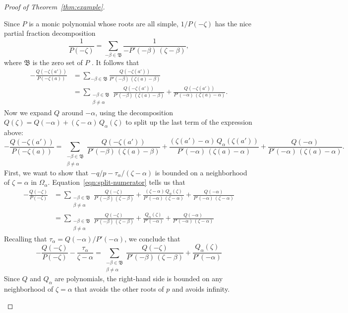 \documentclass{article}
\theoremstyle{plain}
\newcommand{\roots}{\mathfrak{B}}
\newcommand{\domain}{\Omega}
\begin{document}
\begin{proof}[Proof of Theorem~\ref{thm:example}]
\begin{itemize}
Since $P$ is a monic polynomial whose roots are all simple, $1/P(-\zeta)$ has the nice partial fraction decomposition
\[ \frac{1}{P(-\zeta)} = \sum_{-\beta \in \roots} \frac{1}{-P'(-\beta)\,(\zeta - \beta)}, \]
where $\roots$ is the zero set of $P$ \cite[Section 1.4, Exercise~2]{ahlfors}. 
It follows that
\begin{align*}
-\frac{Q(-\zeta(a'))}{P(-\zeta(a))} & = \sum_{-\beta \in \roots} \frac{Q(-\zeta(a'))}{P'(-\beta)\,(\zeta(a) - \beta)} \\
& = \sum_{\substack{-\beta \in \roots \\ \beta \neq \alpha}} \frac{Q(-\zeta(a'))}{P'(-\beta)\,(\zeta(a) - \beta)} + \frac{Q(-\zeta(a'))}{P'(-\alpha)\,(\zeta(a) - \alpha)}.
\end{align*}
Now we expand $Q$ around $-\alpha$, using the decomposition $Q(\zeta) = Q(-\alpha)+(\zeta-\alpha)\,Q_\alpha(\zeta)$ to split up the last term of the expression above:
\begin{equation}\label{eqn:split-numerator}
-\frac{Q(-\zeta(a'))}{P(-\zeta(a))} = \sum_{\substack{-\beta \in \roots \\ \beta \neq \alpha}} \frac{Q(-\zeta(a'))}{P'(-\beta)\,(\zeta(a) - \beta)} + \frac{(\zeta(a') - \alpha)\,Q_\alpha(\zeta(a'))}{P'(-\alpha)\,(\zeta(a) - \alpha)} + \frac{Q(-\alpha)}{P'(-\alpha)\,(\zeta(a) - \alpha)}.
\end{equation}
First, we want to show that $-q/p-\tau_\alpha/(\zeta-\alpha)$ is bounded on a neighborhood of $\zeta = \alpha$ in $\domain_\alpha$. Equation~\eqref{eqn:split-numerator} tells us that
\begin{align*}
-\frac{Q(-\zeta)}{P(-\zeta)} & =
\sum_{\substack{-\beta \in \roots \\ \beta \neq \alpha}} \frac{Q(-\zeta)}{P'(-\beta)\,(\zeta - \beta)} + \frac{(\zeta - \alpha)\,Q_\alpha(\zeta)}{P'(-\alpha)\,(\zeta - \alpha)} + \frac{Q(-\alpha)}{P'(-\alpha)\,(\zeta - \alpha)} \\
&=\sum_{\substack{-\beta \in \roots \\ \beta \neq \alpha}} \frac{Q(-\zeta)}{P'(-\beta)\,(\zeta - \beta)} + \frac{Q_\alpha(\zeta)}{P'(-\alpha)} + \frac{Q(-\alpha)}{P'(-\alpha)\,(\zeta - \alpha)}
\end{align*}
Recalling that $\tau_\alpha = Q(-\alpha)/P'(-\alpha)$, we conclude that
\[-\frac{Q(-\zeta)}{P(-\zeta)}-\frac{\tau_\alpha}{\zeta-\alpha}=\sum_{\substack{-\beta \in \roots \\ \beta \neq \alpha}} \frac{Q(-\zeta)}{P'(-\beta)\,(\zeta - \beta)} + \frac{Q_\alpha(\zeta)}{P'(-\alpha)}\]
Since $Q$ and $Q_\alpha$ are polynomials, the right-hand side is bounded on any neighborhood of $\zeta = \alpha$ that avoids the other roots of $p$ and avoids infinity.


\end{itemize}
\end{proof}
\end{document}
